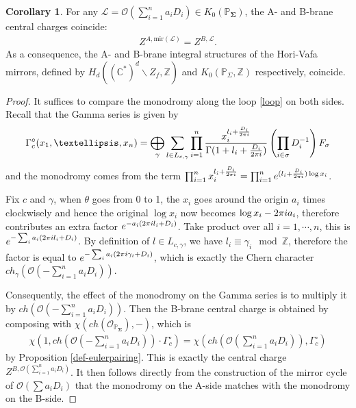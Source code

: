 \documentclass[11pt,reqno]{amsart}
\def\CC {{\mathbb C}}
\def\Z {{\mathbb Z}}
\def\PP {{\mathbb P}}
\def\ii {{\rm i}}
\theoremstyle{definition}
\newtheorem{corollary}[theorem]{Corollary}
\numberwithin{equation}{section}
\begin{document}
\begin{corollary}\label{monodromy}
	For any $\mathcal{L}=\mathcal{O}(\sum_{i=1}^n a_i D_i)\in K_0(\PP_{\mathbf{\Sigma}})$, the A- and B-brane central charges coincide:
	\begin{align*}
		Z^{A,\mathrm{mir}(\mathcal{L})}=Z^{B,\mathcal{L}}.
	\end{align*}
	As a consequence, the A- and B-brane integral structures of the Hori-Vafa mirrors, defined by $H_{d}\left((\CC^*)^{d}\backslash Z_f,\Z\right)$ and 
 $K_0(\PP_{\Sigma},\Z)$ respectively, coincide.

\end{corollary}
\begin{proof}
	It suffices to compare the monodromy along the loop \eqref{loop} on both sides. Recall that the Gamma series is given by
	\begin{align*}
\Gamma_c^{\circ}(x_1,\ldots,x_n) =\bigoplus_{\gamma} \sum_{l\in L_{c,\gamma}} \prod_{i=1}^n 
\frac {x_i^{l_i+\frac {D_i}{2\pi \ii }}}{\Gamma(1+l_i+\frac {D_i}{2\pi \ii })}\left(\prod_{i\in\sigma}D_i^{-1}\right)F_{\sigma}
\end{align*}
and the monodromy comes from the term $\prod_{i=1}^n x_i^{l_i+\frac {D_i}{2\pi \ii }}=\prod_{i=1}^n e^{(l_i+\frac {D_i}{2\pi \ii })\log x_i}$.

Fix $c$ and $\gamma$, when $\theta$ goes from 0 to 1, the $x_i$ goes around the origin $a_i$ times clockwisely and hence the original $\log x_i$ now becomes $\log x_i - 2\pi {\rm i}a_i$, therefore contributes an extra factor $e^{-a_i(2\pi {\rm i}l_i+ D_i)}$. Take product over all $i=1,\cdots, n$, this is $e^{-\sum_{i}a_i(2\pi {\rm i}l_i+ D_i)}$. By definition of $l\in L_{c,\gamma}$, we have $l_i\equiv\gamma_i\mod\Z$, therefore the factor is equal to $e^{-\sum_{i}a_i(2\pi {\rm i}\gamma_i+ D_i)}$, which is exactly the Chern character $ch_{\gamma}(\mathcal{O}(-\sum_{i=1}^n a_i D_i))$.

Consequently, the effect of the monodromy on the Gamma series is to multiply it by $ch(\mathcal{O}(-\sum_{i=1}^n a_i D_i))$. Then the B-brane central charge is obtained by composing with $\chi(ch(\mathcal{O}_{\PP_{\mathbf{\Sigma}}}),-)$, which is
\begin{align*}
	\chi\left(1,ch(\mathcal{O}(-\sum_{i=1}^n a_i D_i))\cdot\Gamma_c^{\circ}\right)=\chi\left(ch(\mathcal{O}(\sum_{i=1}^n a_i D_i)),\Gamma_c^{\circ}\right)
\end{align*}
by Proposition \ref{def-eulerpairing}. This is exactly the central charge $Z^{B,\mathcal{O}(\sum_{i=1}^n a_i D_i)}$. It then follows directly from the construction of the mirror cycle of $\mathcal{O}(\sum a_i D_i)$ that the monodromy on the A-side matches with the monodromy on the B-side.
\end{proof}
\end{document}
